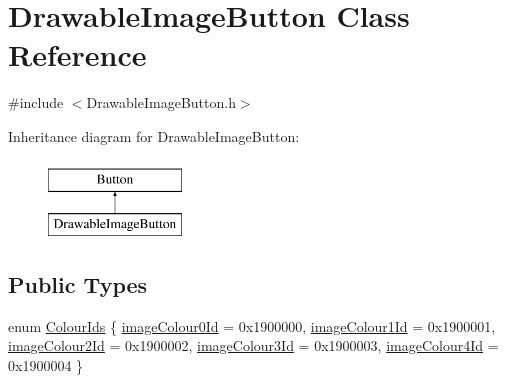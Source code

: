 \hypertarget{classDrawableImageButton}{}\section{Drawable\+Image\+Button Class Reference}
\label{classDrawableImageButton}


{\ttfamily \#include $<$Drawable\+Image\+Button.\+h$>$}

Inheritance diagram for Drawable\+Image\+Button\+:\begin{figure}[H]
\begin{center}
\leavevmode
\includegraphics[height=2.000000cm]{classDrawableImageButton}
\end{center}
\end{figure}
\subsection*{Public Types}
\begin{DoxyCompactItemize}
\item 
enum \mbox{\hyperlink{classDrawableImageButton_a98b213074f21a5e58f241cb9910928e0}{Colour\+Ids}} \{ \newline
\mbox{\hyperlink{classDrawableImageButton_a98b213074f21a5e58f241cb9910928e0ad6cc3065158c83bc847f5c58adf2610f}{image\+Colour0\+Id}} = 0x1900000, 
\mbox{\hyperlink{classDrawableImageButton_a98b213074f21a5e58f241cb9910928e0abab8cbe23db84a86d23c70ef20f55b8b}{image\+Colour1\+Id}} = 0x1900001, 
\mbox{\hyperlink{classDrawableImageButton_a98b213074f21a5e58f241cb9910928e0a1ac4cea3290fcb4773b3656d7ffcb2ef}{image\+Colour2\+Id}} = 0x1900002, 
\mbox{\hyperlink{classDrawableImageButton_a98b213074f21a5e58f241cb9910928e0a66cc5ddfedca47fe23d11618e1f60876}{image\+Colour3\+Id}} = 0x1900003, 
\newline
\mbox{\hyperlink{classDrawableImageButton_a98b213074f21a5e58f241cb9910928e0a9416d9c12bfc3c1f89376e86209f8dd3}{image\+Colour4\+Id}} = 0x1900004
 \}
\end{DoxyCompactItemize}
